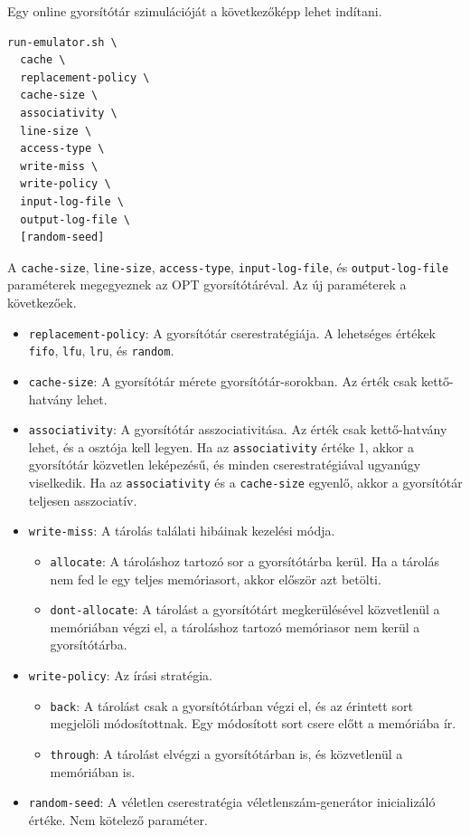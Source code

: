 \documentclass[12pt]{report}
\begin{document}
Egy online gyorsítótár szimulációját a következőképp lehet indítani.
\begin{verbatim}
run-emulator.sh \
  cache \
  replacement-policy \
  cache-size \
  associativity \
  line-size \
  access-type \
  write-miss \
  write-policy \
  input-log-file \
  output-log-file \
  [random-seed]
\end{verbatim}
A \texttt{cache-size}, \texttt{line-size}, \texttt{access-type},
\texttt{input-log-file}, és \texttt{output-log-file}
paraméterek megegyeznek az OPT gyorsítótáréval.
Az új paraméterek a következőek.
\begin{itemize}
\item \texttt{replacement-policy}:
A gyorsítótár cserestratégiája.
A lehetséges értékek \texttt{fifo}, \texttt{lfu},
\texttt{lru}, és \texttt{random}.

\item \texttt{cache-size}: A gyorsítótár mérete gyorsítótár-sorokban.
Az érték csak kettő-hatvány lehet.

\item \texttt{associativity}:
A gyorsítótár asszociativitása.
Az érték csak kettő-hatvány lehet, és a  osztója kell legyen.
Ha az \texttt{associativity} értéke 1, akkor a gyorsítótár közvetlen leképezésű,
és minden cserestratégiával ugyanúgy viselkedik.
Ha az \texttt{associativity} és a \texttt{cache-size} egyenlő,
akkor a gyorsítótár teljesen asszociatív.

\item \texttt{write-miss}: A tárolás találati hibáinak kezelési módja.
\begin{itemize}
\item \texttt{allocate}:
A tároláshoz tartozó sor a gyorsítótárba kerül.
Ha a tárolás nem fed le egy teljes memóriasort,
akkor először azt betölti.
\item \texttt{dont-allocate}:
A tárolást a gyorsítótárt megkerülésével közvetlenül a memóriában végzi el,
a tároláshoz tartozó memóriasor nem kerül a gyorsítótárba.
\end{itemize}

\item \texttt{write-policy}: Az írási stratégia.
\begin{itemize}
\item \texttt{back}:
A tárolást csak a gyorsítótárban végzi el, és az érintett sort
megjelöli módosítottnak.
Egy módosított sort csere előtt a memóriába ír.
\item \texttt{through}:
A tárolást elvégzi a gyorsítótárban is,
és közvetlenül a memóriában is.
\end{itemize}

\item \texttt{random-seed}:
A véletlen cserestratégia véletlenszám-generátor inicializáló értéke.
Nem kötelező paraméter.
\end{itemize}
\end{document}
